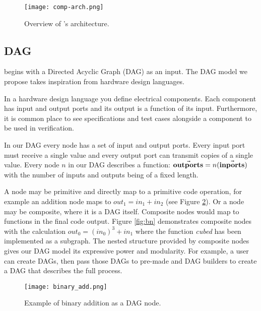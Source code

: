 \begin{figure}[h!]
    \begin{center}
        \texttt{[image: comp-arch.png]}
        \caption{Overview of \phlat{}'s architecture.}
        \label{fig:arch}
    \end{center}
\end{figure}



\subsection{DAG} \label{sec:DAG}

\phlat begins with a Directed Acyclic Graph (DAG) as an input.
The DAG model we propose takes inspiration from hardware design languages.

In a hardware design language you define electrical components.
Each component has input and output ports and its output is a function of its input.
Furthermore, it is common place to see specifications and test cases alongside a component to be used in verification.

In our DAG every node has a set of input and output ports.
Every input port must receive a single value and every output port can transmit copies of a single value.
Every node $n$ in our DAG describes a function: $\vec{\mathbf{out ports}}=n(\vec{\mathbf{in ports}})$ with the number of inputs and outputs being of a fixed length.

A node may be primitive and directly map to a primitive code operation, for example an addition node maps to $out_1 = in_1 + in_2$ (see Figure \ref{fig:bin_add}).
Or a node may be composite, where it is a DAG itself.
Composite nodes would map to functions in the final code output.
Figure \ref{fig:bn} demonstrates composite nodes with the calculation $out_0 = (in_0)^3 + in_1$ where the function \textit{cubed} has been implemented as a subgraph.
The nested structure provided by composite nodes gives our DAG model its expressive power and modularity.
For example, a user can create  DAGs, then pass those DAGs to pre-made  and  DAG builders to create a DAG that describes the full  process.


\begin{figure}[h!]
    \begin{center}
        \texttt{[image: binary\_add.png]}
        \caption{Example of binary addition as a DAG node.}
        \label{fig:bin_add}
    \end{center}
\end{figure}

